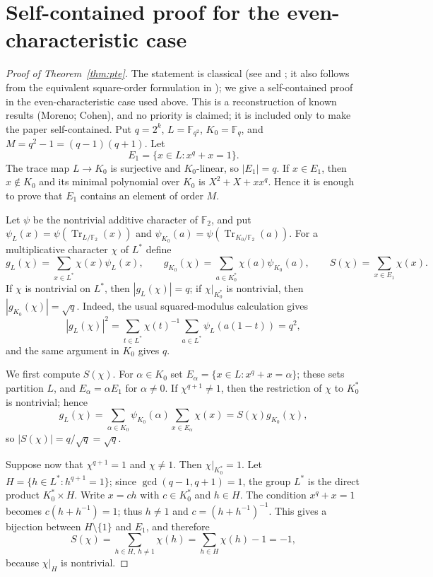 \documentclass[11pt]{article}
\begin{document}
\section{Self-contained proof for the even-characteristic case}\label{app:pte}
\begin{proof}[Proof of Theorem~\ref{thm:pte}]
The statement is classical (see \cite{Mor} and
\cite[Theorem~1, p.~1]{Coh90}; it also follows from the equivalent square-order formulation in
\cite[Theorem~1.5, p.~170]{Coh}); we give a self-contained proof in the
even-characteristic case used above. This is a reconstruction of known results (Moreno; Cohen), and no priority is claimed; it is included only to make the paper self-contained.
Put $q=2^k$, $L=\mathbb{F}_{q^2}$, $K_0=\mathbb{F}_q$, and
$M=q^2-1=(q-1)(q+1)$. Let
\[
E_1=\{x\in L:x^q+x=1\}.
\]
The trace map $L\to K_0$ is surjective and $K_0$-linear, so $|E_1|=q$. If
$x\in E_1$, then $x\notin K_0$ and its minimal polynomial over $K_0$ is
$X^2+X+xx^q$. Hence it is enough to prove that $E_1$ contains an element of
order $M$.

Let $\psi$ be the nontrivial additive character of $\mathbb F_2$, and put
$\psi_L(x)=\psi(\operatorname{Tr}_{L/\mathbb F_2}(x))$ and
$\psi_{K_0}(a)=\psi(\operatorname{Tr}_{K_0/\mathbb F_2}(a))$. For a multiplicative
character $\chi$ of $L^*$ define
\[
g_L(\chi)=\sum_{x\in L^*}\chi(x)\psi_L(x),\qquad
g_{K_0}(\chi)=\sum_{a\in K_0^*}\chi(a)\psi_{K_0}(a),\qquad
S(\chi)=\sum_{x\in E_1}\chi(x).
\]
If $\chi$ is nontrivial on $L^*$, then $|g_L(\chi)|=q$; if
$\chi|_{K_0^*}$ is nontrivial, then $|g_{K_0}(\chi)|=\sqrt q$. Indeed, the usual
squared-modulus calculation gives
\[
|g_L(\chi)|^2
=\sum_{t\in L^*}\chi(t)^{-1}\sum_{a\in L^*}\psi_L(a(1-t))=q^2,
\]
and the same argument in $K_0$ gives $q$.

We first compute $S(\chi)$. For $\alpha\in K_0$ set
$E_\alpha=\{x\in L:x^q+x=\alpha\}$; these sets partition $L$, and
$E_\alpha=\alpha E_1$ for $\alpha\ne0$. If $\chi^{q+1}\ne1$, then the
restriction of $\chi$ to $K_0^*$ is nontrivial; hence
\[
g_L(\chi)
=\sum_{\alpha\in K_0}\psi_{K_0}(\alpha)\sum_{x\in E_\alpha}\chi(x)
=S(\chi)g_{K_0}(\chi),
\]
so $|S(\chi)|=q/\sqrt q=\sqrt q$.

Suppose now that $\chi^{q+1}=1$ and $\chi\ne1$. Then $\chi|_{K_0^*}=1$.
Let $H=\{h\in L^*:h^{q+1}=1\}$; since $\gcd(q-1,q+1)=1$, the group $L^*$
is the direct product $K_0^*\times H$. Write $x=ch$ with $c\in K_0^*$ and
$h\in H$. The condition $x^q+x=1$ becomes
$c(h+h^{-1})=1$; thus $h\ne1$ and $c=(h+h^{-1})^{-1}$. This gives a
bijection between $H\setminus\{1\}$ and $E_1$, and therefore
\[
S(\chi)=\sum_{h\in H,\ h\ne1}\chi(h)
=\sum_{h\in H}\chi(h)-1=-1,
\]
because $\chi|_H$ is nontrivial.


\end{proof}
\end{document}
